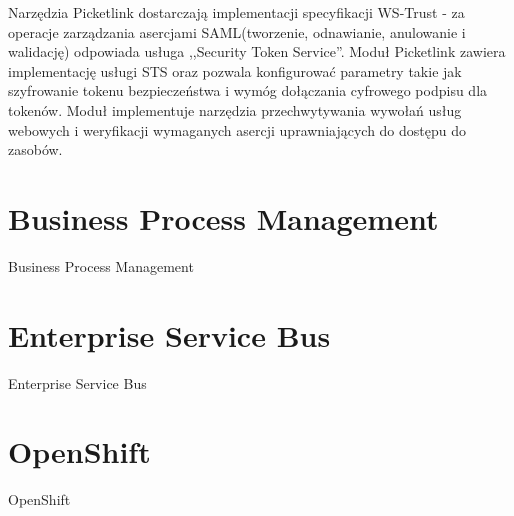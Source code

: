 Narzędzia Picketlink dostarczają implementacji specyfikacji WS-Trust - za operacje zarządzania asercjami SAML(tworzenie, odnawianie, anulowanie i walidację) odpowiada usługa ,,Security Token Service''. Moduł Picketlink zawiera implementację usługi STS oraz pozwala konfigurować parametry takie jak szyfrowanie tokenu bezpieczeństwa i wymóg dołączania cyfrowego podpisu dla tokenów. Moduł implementuje narzędzia przechwytywania wywołań usług webowych i weryfikacji wymaganych asercji uprawniających do dostępu do zasobów. 


\section{Business Process Management}
\label{sec:bpm}

Business Process Management


\section{Enterprise Service Bus}
\label{sec:esb}

Enterprise Service Bus


\section{OpenShift}
\label{sec:openShift}

OpenShift

